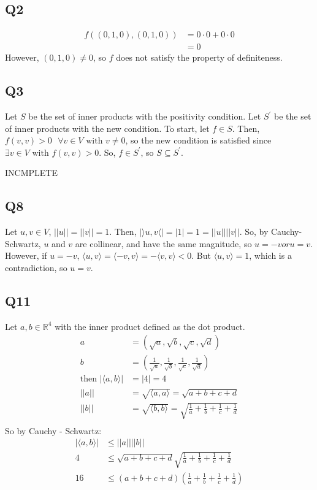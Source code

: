 \documentclass{article}
\begin{document}
\subsection*{Q2}
	\begin{align*}
		f((0, 1, 0), (0, 1, 0)) &= 0 \cdot 0 + 0\cdot 0\\
		&=0
	\end{align*}
	However, $(0, 1, 0) \neq 0$, so $f$ does not satisfy the property of definiteness.
	
\subsection*{Q3}
Let $S$ be the set of inner products with the positivity condition. 
Let  $S^\prime$ be the set of inner products with the new condition. To start, let $f \in S$. Then, $f(v, v) > 0 \text{ } \forall v \in V \text{ with } v \neq 0$, so the new condition is satisfied since $\exists v \in V \text{ with } f(v, v) > 0$. So, $f \in S^\prime$, so $S \subseteq S^\prime$. 
\begin{huge}
INCMPLETE
\end{huge}

\subsection*{Q8}
Let $u, v \in V$, $||u|| = ||v|| = 1$. Then, $|\rangle u, v \langle| = |1| = 1 = ||u|| ||v||$. So, by Cauchy-Schwartz, $u$ and $v$ are collinear, and have the same magnitude, so $u = -v or u = v$. However, if $u = -v$, $\langle u, v \rangle = \langle -v, v \rangle = - \langle v, v \rangle < 0$. But $\langle u, v \rangle = 1$, which is a contradiction, so $u = v$.

\subsection*{Q11}
Let $a,b \in \mathbb{R}^4$ with the inner product defined as the dot product. 
\begin{align*}
	a &= (\sqrt{a}, \sqrt{b}, \sqrt{c}, \sqrt{d})\\
	b &= (\frac{1}{\sqrt{a}}, \frac{1}{\sqrt{b}}, \frac{1}{\sqrt{c}},\frac{1}{\sqrt{d}})\\
	\text{then } |\langle a, b \rangle| &= |4| = 4\\
	||a|| &= \sqrt{\langle a, a \rangle} = \sqrt{a + b + c + d}\\
	||b|| &= \sqrt{\langle b, b \rangle} = \sqrt{\frac{1}{a} + \frac{1}{b} + \frac{1}{c} + \frac{1}{d}}\\
\end{align*}
So by Cauchy - Schwartz:
\begin{align*}
	|\langle a, b \rangle| &\leq ||a|| ||b||\\
	4 &\leq \sqrt{a + b + c + d} \sqrt{\frac{1}{a} + \frac{1}{b} + \frac{1}{c} + \frac{1}{d}}\\
	16 &\leq (a+b+c+d)(\frac{1}{a} + \frac{1}{b}+ \frac{1}{c}+\frac{1}{d})\\
\end{align*}
\end{document}
